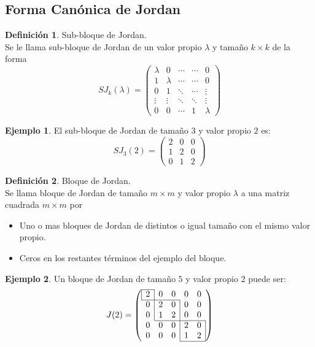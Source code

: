 \documentclass[10pt]{article}
\theoremstyle{definition}
\newtheorem{definition}{Definición}[section]
\newtheorem{example}{Ejemplo}[section]
\begin{document}
\subsection{Forma Canónica de Jordan}
\begin{definition}{Sub-bloque de Jordan.}
	\\Se le llama sub-bloque de Jordan de un valor propio $\lambda$ y tamaño $k\times k$ de la forma
	$$SJ_k\left( \lambda \right) =\begin{pmatrix}
			\lambda & 0       & \cdots & \cdots & 0       \\
			1       & \lambda & \cdots & \cdots & 0       \\
			0       & 1       & \ddots & \cdots & \vdots  \\
			\vdots  & \vdots  & \ddots & \ddots & \vdots  \\
			0       & 0       & \cdots & 1      & \lambda
		\end{pmatrix} $$
\end{definition}
\begin{example}
	El sub-bloque de Jordan de tamaño $3$ y valor propio $2$ es:
	$$SJ_3(2)=\begin{pmatrix}
			2 & 0 & 0 \\
			1 & 2 & 0 \\
			0 & 1 & 2
		\end{pmatrix}$$
\end{example}
\begin{definition}{Bloque de Jordan.}
	\\Se llama bloque de Jordan de tamaño $m\times m$ y valor propio $\lambda$ a una matriz cuadrada $m\times m$ por
	\begin{itemize}
		\item Uno o mas bloques de Jordan de distintos o igual tamaño con el mismo valor propio.
		\item Ceros en los restantes términos del ejemplo del bloque.
	\end{itemize}
\end{definition}
\begin{example}
	Un bloque de Jordan de tamaño $5$ y valor propio $2$ puede ser:
	$$
		J(2)=\left(\begin{array}{lllll}
			\cline{1-1}
			\multicolumn{1}{|l|}{2} & 0 & 0                      & 0 & 0                      \\ \cline{1-3}
			\multicolumn{1}{l|}{0}  & 2 & \multicolumn{1}{l|}{0} & 0 & 0                      \\
			\multicolumn{1}{l|}{0}  & 1 & \multicolumn{1}{l|}{2} & 0 & 0                      \\ \cline{2-5}
			0                       & 0 & \multicolumn{1}{l|}{0} & 2 & \multicolumn{1}{l|}{0} \\
			0                       & 0 & \multicolumn{1}{l|}{0} & 1 & \multicolumn{1}{l|}{2} \\ \cline{4-5}
		\end{array}\right)
	$$

\end{example}\newpage
\end{document}

